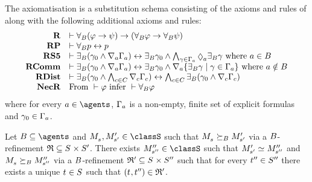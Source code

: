 \begin{definition}
    The axiomatisation \axiomRmlS{} is a substitution schema consisting of the axioms and rules of \axiomS{} along with the following additional axioms and rules:
$$
\begin{array}{rl}
    {\bf R} & \proves \allrefsBs (\phi \implies \psi) \implies (\allrefsBs \phi \implies \allrefsBs \psi)\\
    {\bf RP} & \proves \allrefsBs \atomP \iff \atomP\\
    {\bf RS5} & \proves \somerefsBs (\gamma_0 \land \coversA \Gamma_\agentA) \iff \somerefsBs \gamma_0 \land \bigwedge_{\gamma \in \Gamma_\agentA} \possibleA \somerefsBs \gamma \text{ where } \agentA \in \agentsB\\
    {\bf RComm} & \proves \somerefsBs (\gamma_0 \land \coversA \Gamma_\agentA) \iff \somerefsBs \gamma_0 \land \coversA \{\somerefsBs \gamma \mid \gamma \in \Gamma_\agentA\} \text{ where } \agentA \notin \agentsB\\
    {\bf RDist} & \proves \somerefsBs (\gamma_0 \land \bigwedge_{\agentC \in \agentsC} \coversC \Gamma_\agentC) \iff \bigwedge_{\agentC \in \agentsC} \somerefsBs (\gamma_0 \land \coversC \Gamma_\agentC)\\
    {\bf NecR} & \text{From } \proves \phi \text{ infer } \proves \allrefsBs \phi
\end{array}
$$
where for every $\agentA \in \agents$, $\Gamma_a$ is a non-empty, finite set of explicit formulas and $\gamma_0 \in \Gamma_a$.
\end{definition}

\begin{lemma}\label{refinement-functional}
Let $\agentsB \subseteq \agents$ and $\kPModel{\kStateS}, \kPModelP{\kStateSP} \in \classS$ such that $\kPModel{\kStateS} \simulatesBs \kPModelP{\kStateSP}$ via a $B$-refinement $\refinement \subseteq \kStates \times \kStatesP$.
There exists $\kPModelPP{\kStateSPP} \in \classS$ such that $\kPModelP{\kStateSP} \bisimilar \kPModelPP{\kStateSPP}$ and $\kPModel{\kStateS} \simulatesBs \kPModelPP{\kStateSPP}$ via a $B$-refinement $\refinement' \subseteq \kStates \times \kStatesPP$ such that for every ${t}^{\prime\prime} \in {S^{\prime\prime}}$ there exists a unique $\kStateT \in \kStates$ such that $(\kStateT, \kStateTPP) \in \refinement'$.
\end{lemma}

